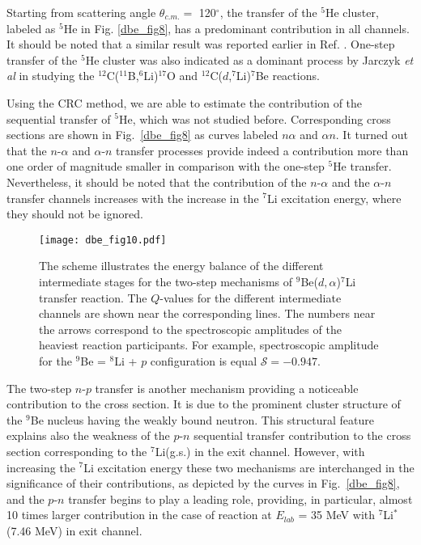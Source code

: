 \documentclass[
12pt, %
oneside, %
english, %
onehalfspacing, %
onehalfspacing, %
headsepline, %
]{MastersDoctoralThesis} %
\begin{document}
Starting from scattering angle $\theta_{c.m.} =$ 120$^\circ$, the transfer of the ${}^5$He cluster, labeled as ${}^5$He in Fig. \ref{dbe_fig8}, has a predominant contribution in all channels. It should be noted that a similar result was reported earlier in Ref. \cite{bodek1989}. One-step transfer of the ${}^5$He cluster was also indicated as a dominant process by Jarczyk \textit{et al} \cite{jarczyk1996} in studying the ${}^{12}$C(${}^{11}$B,${}^6$Li)${}^{17}$O and ${}^{12}$C($d$,${}^7$Li)${}^{7}$Be reactions.

Using the CRC method, we are able to estimate the contribution of the sequential transfer of ${}^5$He, which was not studied before. Corresponding cross sections are shown in Fig.~\ref{dbe_fig8} as curves labeled $n\alpha$ and $\alpha n$.
It turned out that the $n$-$\alpha$ and $\alpha$-$n$ transfer processes provide indeed a contribution more than one order of magnitude smaller in comparison with the one-step ${}^5$He transfer. Nevertheless, it should be noted that the contribution of the $n$-$\alpha$ and the $\alpha$-$n$ transfer channels increases with the increase in the ${}^7$Li excitation energy, where they should not be ignored.

\begin{figure}%
\centering
\texttt{[image: dbe\_fig10.pdf]}
\decoRule
\caption{\label{dbe_fig10} \footnotesize The scheme illustrates the energy balance of the different intermediate stages for the two-step mechanisms of ${}^9$Be($d,\alpha$)${}^7$Li transfer reaction. The $Q$-values for the different intermediate channels are shown near the corresponding lines. The numbers near the arrows correspond to the spectroscopic amplitudes of the heaviest reaction participants. For example, spectroscopic amplitude for the ${}^9$Be = ${}^8$Li + $p$ configuration is equal $\mathcal{S} = -0.947$.}
\end{figure}

The two-step $n$-$p$ transfer is another mechanism providing a noticeable contribution to the cross section. It is due to the prominent cluster structure of the ${}^9$Be nucleus having the weakly bound neutron. This structural feature explains also the weakness of the $p$-$n$ sequential transfer contribution to the cross section corresponding to the ${}^7$Li(g.s.) in the exit channel. However, with increasing the ${}^7$Li excitation energy these two mechanisms are interchanged in the significance of their contributions, as depicted by the curves in Fig.~\ref{dbe_fig8}, and the $p$-$n$ transfer begins to play a leading role, providing, in particular, almost 10 times larger contribution in the case of reaction at $E_{lab}$ = 35 MeV with ${}^7$Li$^*$(7.46 MeV) in exit channel.
\end{document}
